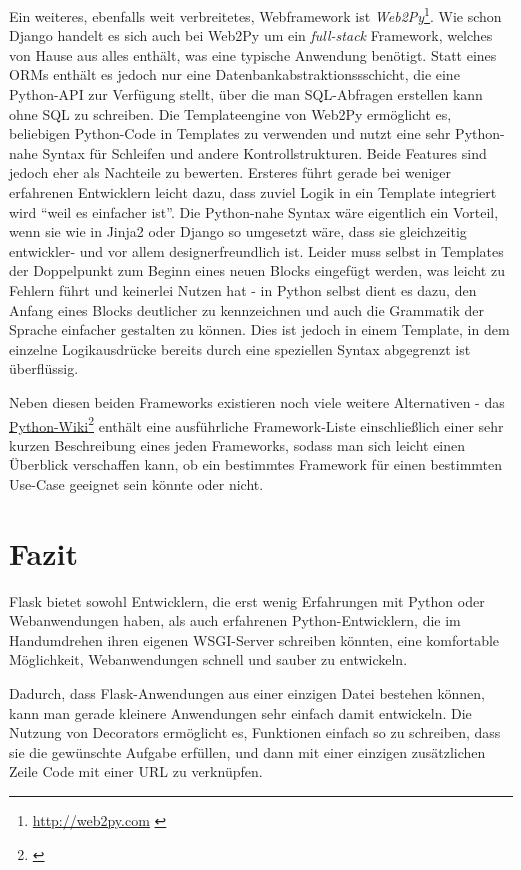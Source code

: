 Ein weiteres, ebenfalls weit verbreitetes, Webframework ist
\emph{Web2Py}\footnote{\href{http://web2py.com}{http://web2py.com} \citep{web2py}}. Wie schon Django handelt es
sich auch bei Web2Py um ein \emph{full-stack} Framework, welches von Hause aus alles enthält, was
eine typische Anwendung benötigt. Statt eines ORMs enthält es jedoch nur eine
Datenbankabstraktionssschicht, die eine Python-API zur Verfügung stellt, über die man SQL-Abfragen
erstellen kann ohne SQL zu schreiben. Die Templateengine von Web2Py ermöglicht es, beliebigen
Python-Code in Templates zu verwenden und nutzt eine sehr Python-nahe Syntax für Schleifen und
andere Kontrollstrukturen. Beide Features sind jedoch eher als Nachteile zu bewerten. Ersteres führt
gerade bei weniger erfahrenen Entwicklern leicht dazu, dass zuviel Logik in ein Template integriert
wird \enquote{weil es einfacher ist}. Die Python-nahe Syntax wäre eigentlich ein Vorteil, wenn sie
wie in Jinja2 oder Django so umgesetzt wäre, dass sie gleichzeitig entwickler- und vor allem
designerfreundlich ist. Leider muss selbst in Templates der Doppelpunkt zum Beginn eines neuen
Blocks eingefügt werden, was leicht zu Fehlern führt und keinerlei Nutzen hat - in Python selbst
dient es dazu, den Anfang eines Blocks deutlicher zu kennzeichnen und auch die Grammatik der Sprache
einfacher gestalten zu können. Dies ist jedoch in einem Template, in dem einzelne Logikausdrücke
bereits durch eine speziellen Syntax abgegrenzt ist überflüssig.

Neben diesen beiden Frameworks existieren noch viele weitere Alternativen - das
\href{http://wiki.python.org/moin/WebFrameworks}{Python-Wiki}\footnote{\citep{pythonwebframeworks}}
enthält eine ausführliche
Framework-Liste einschließlich einer sehr kurzen Beschreibung eines jeden Frameworks, sodass man
sich leicht einen Überblick verschaffen kann, ob ein bestimmtes Framework für einen bestimmten
Use-Case geeignet sein könnte oder nicht.

\section{Fazit}
Flask bietet sowohl Entwicklern, die erst wenig Erfahrungen mit Python oder Webanwendungen haben,
als auch erfahrenen Python-Entwicklern, die im Handumdrehen ihren eigenen WSGI-Server schreiben
könnten, eine komfortable Möglichkeit, Webanwendungen schnell und sauber zu entwickeln.

Dadurch, dass Flask-Anwendungen aus einer einzigen Datei bestehen können, kann man gerade kleinere
Anwendungen sehr einfach damit entwickeln. Die Nutzung von Decorators ermöglicht es, Funktionen
einfach so zu schreiben, dass sie die gewünschte Aufgabe erfüllen, und dann mit einer einzigen
zusätzlichen Zeile Code mit einer URL zu verknüpfen.

